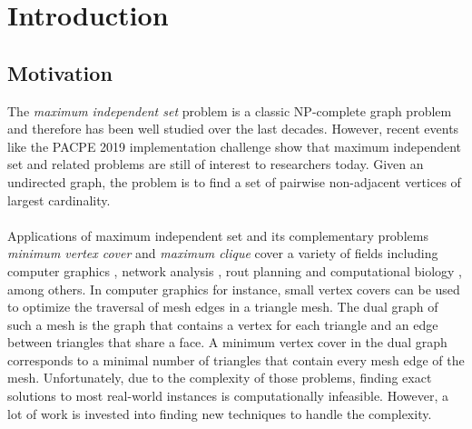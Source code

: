 \documentclass[]{article}
\title{}
\author{}
\begin{document}



\section{Introduction} \label{sec1}
\subsection{Motivation}
The \emph{maximum independent set} problem is a classic NP-complete graph problem \cite{GareyJohnson} and therefore has been well studied over the last decades. However, recent events like the PACPE 2019 implementation challenge \cite{bibitem} show that maximum independent set and related problems are still of interest to researchers today. Given an undirected graph, the problem is to find a set of pairwise non-adjacent vertices of largest cardinality.\paragraph{}
Applications of maximum independent set and its complementary problems \emph{minimum vertex cover} and \emph{maximum clique} cover a variety of fields including computer graphics \cite{CG}, network analysis \cite{NW}, rout planning \cite{RP} and computational biology \cite{BIO1, BIO2}, among others. In computer graphics for instance, small vertex covers can be used to optimize the traversal of mesh edges in a triangle mesh. The dual graph of such a mesh is the graph that contains a vertex for each triangle and an edge between triangles that share a face. A minimum vertex cover in the dual graph corresponds to a minimal number of triangles that contain every mesh edge of the mesh. Unfortunately, due to the complexity of those problems, finding exact solutions to most real-world instances is computationally infeasible. However, a lot of work is invested into finding new techniques to handle the complexity. \paragraph{}
\end{document}
